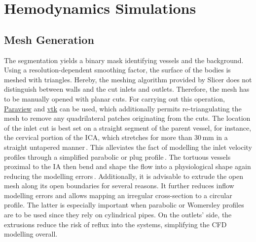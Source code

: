 \section{Hemodynamics Simulations}\label{chap3:sec2}

\subsection{Mesh Generation}\label{chap3:sec2:subsec:1}
The segmentation yields a binary mask identifying vessels and the background. Using a resolution-dependent smoothing factor, the surface of the bodies is meshed with triangles. Hereby, the meshing algorithm provided by Slicer does not distinguish between walls and the cut inlets and outlets. Therefore, the mesh has to be manually opened with planar cuts. For carrying out this operation, \href{https://www.paraview.org/}{Paraview} and \href{https://vtk.org/}{vtk} can be used, which additionally permits re-triangulating the mesh to remove any quadrilateral patches originating from the cuts. The location of the inlet cut is best set on a straight segment of the parent vessel, for instance, the cervical portion of the ICA, which stretches for more than 30\,mm in a straight untapered manner\,\cite{Vijaywargiya2017}. This alleviates the fact of modelling the inlet velocity profiles through a simplified parabolic or plug profile\,\cite{Castro2006, Hodis2015}. The tortuous vessels proximal to the IA then bend and shape the flow into a physiological shape again reducing the modelling errors\,\cite{Berg2019}. Additionally, it is advisable to extrude the open mesh along its open boundaries for several reasons. It further reduces inflow modelling errors and allows mapping an irregular cross-section to a circular profile. The latter is especially important when parabolic or Womersley profiles are to be used since they rely on cylindrical pipes. On the outlets' side, the extrusions reduce the risk of reflux into the systems, simplifying the CFD modelling overall.

